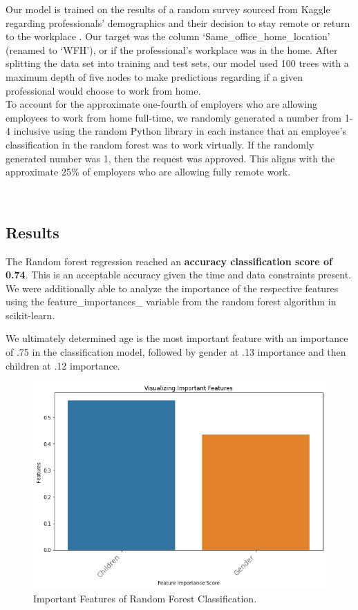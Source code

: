 \documentclass{article}
\begin{document}
Our model is trained on the results of a random survey sourced from Kaggle regarding professionals’ demographics and their decision to stay remote or return to the workplace \cite{kaggle}. Our target was the column ‘Same\_office\_home\_location’ (renamed to ‘WFH’), or if the professional’s workplace was in the home. After splitting the data set into training and test sets, our model used 100 trees with a maximum depth of five nodes to make predictions regarding if a given professional would choose to work from home. \\
\indent
To account for the approximate one-fourth of employers who are allowing employees to work from home full-time, we randomly generated a number from 1-4 inclusive using the random Python library in each instance that an employee’s classification in the random forest was to work virtually. If the randomly generated number was 1, then the request was approved. This aligns with the approximate 25\% of employers who are allowing fully remote work.

\


\subsection{Results}
\indent
The Random forest regression reached an \textbf{accuracy classification score of 0.74}. This is an acceptable accuracy given the time and data constraints present. We were additionally able to analyze the importance of the respective features using the feature\_importances\_ variable from the random forest algorithm in scikit-learn.

\indent
We ultimately determined age is the most important feature with an importance of .75 in the classification model, followed by gender at .13 importance and then children at .12 importance. 
\begin{figure}
  \centering
  \includegraphics[width=.55\linewidth]{import.png}
  \caption{Important Features of Random Forest Classification.}
  \label{fig:ImportantQ2}
\end{figure}
\
\end{document}
